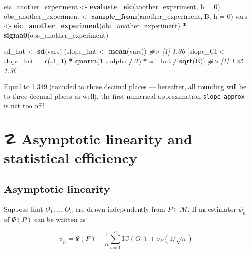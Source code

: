 \documentclass[11pt,openright,twoside]{book}
\newenvironment{Shaded}{\begin{snugshade}}{\end{snugshade}}
\newcommand{\CommentTok}[1]{\textcolor[rgb]{0.56,0.35,0.01}{\textit{#1}}}
\newcommand{\DataTypeTok}[1]{\textcolor[rgb]{0.13,0.29,0.53}{#1}}
\newcommand{\DecValTok}[1]{\textcolor[rgb]{0.00,0.00,0.81}{#1}}
\newcommand{\KeywordTok}[1]{\textcolor[rgb]{0.13,0.29,0.53}{\textbf{#1}}}
\newcommand{\NormalTok}[1]{#1}
\newcommand{\OperatorTok}[1]{\textcolor[rgb]{0.81,0.36,0.00}{\textbf{#1}}}
\newcommand{\StringTok}[1]{\textcolor[rgb]{0.31,0.60,0.02}{#1}}
\DeclareRobustCommand{\stixdanger}{%
  {\usefont{U}{stixbbit}{m}{it}\symbol{"F6}}%
}
\newcommand{\calM}{\mathcal{M}}
\newcommand{\IC}{\textrm{IC}}
\theoremstyle{definition}
\theoremstyle{definition}
\theoremstyle{definition}
\theoremstyle{remark}
\begin{document}
\begin{Shaded}
\begin{Highlighting}[]
\NormalTok{eic_another_experiment <-}\StringTok{ }\KeywordTok{evaluate_eic}\NormalTok{(another_experiment, }\DataTypeTok{h =} \DecValTok{0}\NormalTok{)}
\NormalTok{obs_another_experiment <-}\StringTok{ }\KeywordTok{sample_from}\NormalTok{(another_experiment, B, }\DataTypeTok{h =} \DecValTok{0}\NormalTok{)}
\NormalTok{vars <-}\StringTok{ }\KeywordTok{eic_another_experiment}\NormalTok{(obs_another_experiment) }\OperatorTok{*}
\StringTok{  }\KeywordTok{sigma0}\NormalTok{(obs_another_experiment)}

\NormalTok{sd_hat <-}\StringTok{ }\KeywordTok{sd}\NormalTok{(vars)}
\NormalTok{(slope_hat <-}\StringTok{ }\KeywordTok{mean}\NormalTok{(vars))}
\CommentTok{#> [1] 1.36}
\NormalTok{(slope_CI <-}\StringTok{ }\NormalTok{slope_hat }\OperatorTok{+}\StringTok{ }\KeywordTok{c}\NormalTok{(}\OperatorTok{-}\DecValTok{1}\NormalTok{, }\DecValTok{1}\NormalTok{) }\OperatorTok{*}
\StringTok{   }\KeywordTok{qnorm}\NormalTok{(}\DecValTok{1} \OperatorTok{-}\StringTok{ }\NormalTok{alpha }\OperatorTok{/}\StringTok{ }\DecValTok{2}\NormalTok{) }\OperatorTok{*}\StringTok{ }\NormalTok{sd_hat }\OperatorTok{/}\StringTok{ }\KeywordTok{sqrt}\NormalTok{(B))}
\CommentTok{#> [1] 1.35 1.36}
\end{Highlighting}
\end{Shaded}

Equal to 1.349 (rounded to three decimal places ---
hereafter, all rounding will be to three decimal places as well), the first
numerical approximation \texttt{slope\_approx} is not too off!

\hypertarget{influence-curves}{%
\section{\texorpdfstring{☡ \stixdanger{} Asymptotic linearity and statistical efficiency}{☡  Asymptotic linearity and statistical efficiency}}\label{influence-curves}}

\hypertarget{asymptotic-linearity}{%
\subsection{Asymptotic linearity}\label{asymptotic-linearity}}

Suppose that \(O_{1}, \ldots, O_{n}\) are drawn independently from \(P\in \calM\). If an estimator \(\psi_n\) of \(\Psi(P)\) can be written as

\begin{equation} 
\psi_n  =  \Psi(P) +  \frac{1}{n}\sum_{i=1}^n  \IC(O_i)  +
o_{P}(1/\sqrt{n}) \label{eq:asymptotic-lin}
\end{equation}
\end{document}
